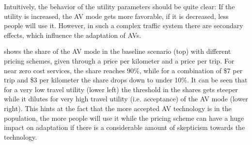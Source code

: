 Intuitively, the behavior of the utility parameters should be quite clear: If
the utility is increased, the AV mode gets more favorable, if it is decreased, less
people will use it. However, in such a complex traffic system there are secondary
effects, which influence the adaptation of AVs.

 shows the share of the AV mode in the baseline scenario (top)
with different pricing schemes, given through a price per kilometer and a price
per trip. For near zero cost services, the share reaches 90\%, while for a combination
of \$7 per trip and \$3 per kilometer the share drops down to under 10\%. It can
be seen that for a very low travel utility (lower left) the threshold in the shares
gets steeper while it dilutes for  very high travel utility (i.e. acceptance)
of the AV mode (lower right). This hints at the fact that the more accepted AV
technology is in the population, the more people will use it while the pricing
scheme can have a huge impact on adaptation if there is a considerable amount of
skepticism towards the technology.

